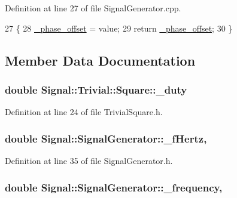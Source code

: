 Definition at line 27 of file Signal\+Generator.\+cpp.


\begin{DoxyCode}
27                                                                    \{
28     \hyperlink{classSignal_1_1SignalGenerator_a6b4444d46747c8517171edbbf4b5588f}{\_phase\_offset} = value;
29     \textcolor{keywordflow}{return} \hyperlink{classSignal_1_1SignalGenerator_a6b4444d46747c8517171edbbf4b5588f}{\_phase\_offset};
30 \}
\end{DoxyCode}


\subsection{Member Data Documentation}
\hypertarget{classSignal_1_1Trivial_1_1Square_aa1eef76b9a4cd2e255f19f11d44db4f5}{
\subsubsection[{\+\_\+duty}]{\setlength{\rightskip}{0pt plus 5cm}double Signal\+::\+Trivial\+::\+Square\+::\+\_\+duty\hspace{0.3cm}{\ttfamily [protected]}}}\label{classSignal_1_1Trivial_1_1Square_aa1eef76b9a4cd2e255f19f11d44db4f5}


Definition at line 24 of file Trivial\+Square.\+h.

\hypertarget{classSignal_1_1SignalGenerator_a85a4702347352bab1c71e0a8df8437d6}{
\subsubsection[{\+\_\+f\+Hertz}]{\setlength{\rightskip}{0pt plus 5cm}double Signal\+::\+Signal\+Generator\+::\+\_\+f\+Hertz\hspace{0.3cm}{\ttfamily [protected]}, {\ttfamily [inherited]}}}\label{classSignal_1_1SignalGenerator_a85a4702347352bab1c71e0a8df8437d6}


Definition at line 35 of file Signal\+Generator.\+h.

\hypertarget{classSignal_1_1SignalGenerator_a7f107461333bce68c5dad412db96a8c2}{
\subsubsection[{\+\_\+frequency}]{\setlength{\rightskip}{0pt plus 5cm}double Signal\+::\+Signal\+Generator\+::\+\_\+frequency\hspace{0.3cm}{\ttfamily [protected]}, {\ttfamily [inherited]}}}\label{classSignal_1_1SignalGenerator_a7f107461333bce68c5dad412db96a8c2}


